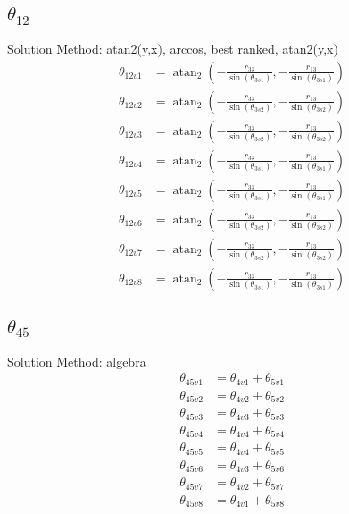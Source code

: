 \documentclass[letterpaper]{article}
\begin{document}
\subsection{$\theta_{12}$ } 
Solution Method: atan2(y,x), arccos, best ranked, atan2(y,x)
\begin{align}
  \theta_{12v1} &= \operatorname{atan}_{2}{\left(- \frac{r_{33}}{\sin{\left(\theta_{3s1} \right)}},- \frac{r_{13}}{\sin{\left(\theta_{3s1} \right)}} \right)} \\
  \theta_{12v2} &= \operatorname{atan}_{2}{\left(- \frac{r_{33}}{\sin{\left(\theta_{3s2} \right)}},- \frac{r_{13}}{\sin{\left(\theta_{3s2} \right)}} \right)} \\
  \theta_{12v3} &= \operatorname{atan}_{2}{\left(- \frac{r_{33}}{\sin{\left(\theta_{3s2} \right)}},- \frac{r_{13}}{\sin{\left(\theta_{3s2} \right)}} \right)} \\
  \theta_{12v4} &= \operatorname{atan}_{2}{\left(- \frac{r_{33}}{\sin{\left(\theta_{3s1} \right)}},- \frac{r_{13}}{\sin{\left(\theta_{3s1} \right)}} \right)} \\
  \theta_{12v5} &= \operatorname{atan}_{2}{\left(- \frac{r_{33}}{\sin{\left(\theta_{3s1} \right)}},- \frac{r_{13}}{\sin{\left(\theta_{3s1} \right)}} \right)} \\
  \theta_{12v6} &= \operatorname{atan}_{2}{\left(- \frac{r_{33}}{\sin{\left(\theta_{3s2} \right)}},- \frac{r_{13}}{\sin{\left(\theta_{3s2} \right)}} \right)} \\
  \theta_{12v7} &= \operatorname{atan}_{2}{\left(- \frac{r_{33}}{\sin{\left(\theta_{3s2} \right)}},- \frac{r_{13}}{\sin{\left(\theta_{3s2} \right)}} \right)} \\
  \theta_{12v8} &= \operatorname{atan}_{2}{\left(- \frac{r_{33}}{\sin{\left(\theta_{3s1} \right)}},- \frac{r_{13}}{\sin{\left(\theta_{3s1} \right)}} \right)} \end{align} 



\subsection{$\theta_{45}$ } 
Solution Method: algebra
\begin{align}
  \theta_{45v1} &= \theta_{4v1} + \theta_{5v1} \\
  \theta_{45v2} &= \theta_{4v2} + \theta_{5v2} \\
  \theta_{45v3} &= \theta_{4v3} + \theta_{5v3} \\
  \theta_{45v4} &= \theta_{4v4} + \theta_{5v4} \\
  \theta_{45v5} &= \theta_{4v4} + \theta_{5v5} \\
  \theta_{45v6} &= \theta_{4v3} + \theta_{5v6} \\
  \theta_{45v7} &= \theta_{4v2} + \theta_{5v7} \\
  \theta_{45v8} &= \theta_{4v1} + \theta_{5v8} \end{align} 
\end{document}
